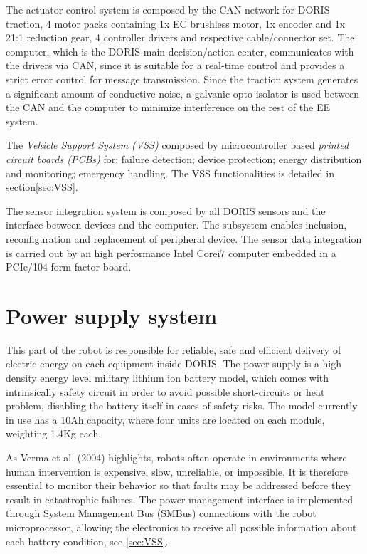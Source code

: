 \documentclass{ifacconf}
\begin{document}
The actuator control system is composed by the CAN network for DORIS
traction, 4 motor packs containing 1x EC brushless motor, 1x encoder and 1x
21:1 reduction gear, 4 controller drivers and respective cable/connector set.
The computer, which is the DORIS main decision/action center, communicates with
the drivers via CAN, since it is suitable for a real-time control and provides
a strict error control for message transmission. Since the traction system
generates a significant amount of conductive noise, a galvanic opto-isolator is
used between the CAN and the computer to minimize interference on the rest of
the EE system.

The \emph{Vehicle Support System (VSS)} composed by microcontroller based
\emph{printed circuit boards (PCBs)} for: failure detection; device protection;
energy distribution and monitoring; emergency handling\cite{MARIUS}. The VSS
functionalities is detailed in section\ref{sec:VSS}.

The sensor integration system is composed by all DORIS sensors and the interface
between devices and the computer. The subsystem enables inclusion,
reconfiguration and replacement of peripheral device. The sensor data
integration is carried out by an high performance Intel\textregistered
Core\texttrademark i7 computer embedded in a PCIe/104 form factor board.
  
\newpage
\section{Power supply system}\label{sec:powersupply_overview}
This part of the robot is responsible for reliable, safe and efficient delivery
of electric energy on each equipment inside DORIS. The power supply is a high
density energy level military lithium ion battery model, which comes with
intrinsically safety circuit in order to avoid possible short-circuits or heat
problem, disabling the battery itself in cases of safety risks. The model
currently in use has a 10Ah capacity, where four units are located on each
module, weighting 1.4Kg each.

As Verma et al. (2004) highlights, robots often operate in environments where
human intervention is expensive, slow, unreliable, or impossible. It is
therefore essential to monitor their behavior so that faults may be addressed
before they result in catastrophic failures. The power management interface is
implemented through System Management Bus (SMBus) connections with the robot
microprocessor, allowing the electronics to receive all possible information
about each battery condition, see \ref{sec:VSS}. 
\end{document}
